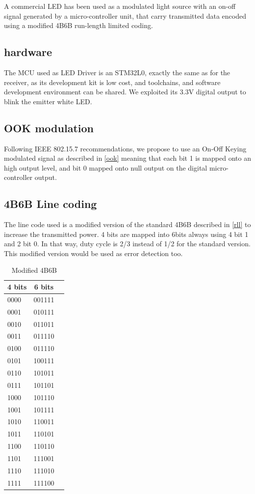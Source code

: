 A commercial LED has been used as a modulated light source with an on-off signal generated by a micro-controller unit, that carry transmitted data encoded using a modified 4B6B run-length limited coding.

\subsection{hardware}
The MCU used as LED Driver is an STM32L0, exactly the same as for the receiver, as its development kit is low cost, and toolchains, and software development environment can be shared. We exploited its 3.3V digital output to blink the emitter white LED.

\subsection{OOK modulation}
Following IEEE 802.15.7 recommendations, we propose to use an On-Off Keying modulated signal as described in \ref{ook} meaning that each bit 1 is mapped onto an high output level, and bit 0 mapped onto null output on the digital micro-controller output. 

\subsection{4B6B Line coding}

The line code used is a modified version of the standard 4B6B described in \ref{rll} to increase the transmitted power.
4 bits are mapped into 6bits always using 4 bit 1 and 2 bit 0. In that way, duty cycle is 2/3 instead of 1/2 for the standard version. This modified version would be used as error detection too.

\begin{table}[htbp]
\begin{center}
\begin{tabular}{|l|c|r|}
  \hline
  4 bits & 6 bits \\
  \hline
  0000 & 001111 \\
  0001 & 010111 \\
  0010 & 011011 \\
  0011 & 011110 \\
  0100 & 011110 \\
  0101 & 100111 \\
  0110 & 101011 \\
  0111 & 101101 \\
  1000 & 101110 \\
  1001 & 101111 \\
  1010 & 110011 \\
  1011 & 110101 \\
  1100 & 110110 \\
  1101 & 111001 \\
  1110 & 111010 \\
  1111 & 111100 \\
  \hline
\end{tabular}
\end{center}
\caption{Modified 4B6B}
\label{tab:m4b6b}
\end{table}


